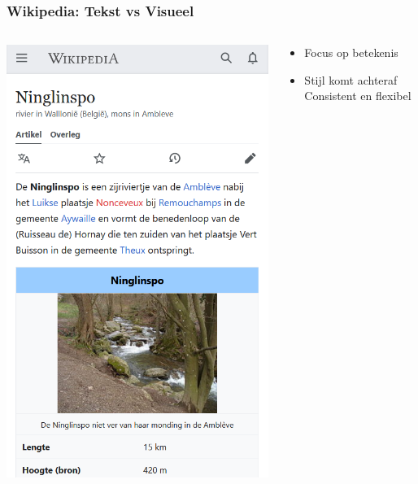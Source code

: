 \documentclass[../presentatie.tex]{subfiles}
\begin{document}
    
    \begin{frame}
        \frametitle{Wikipedia: Tekst vs Visueel}
        \begin{columns}
            \begin{column}{0.6\textwidth}
                \centering
                \includegraphics[width=\linewidth,height=0.7\textheight,keepaspectratio]{assets/wikipediaVisual}
            \end{column}
            \begin{column}{0.45\textwidth}
                \begin{itemize}
                    \item Focus op betekenis
                    \item Stijl komt achteraf \textrightarrow{} Consistent en flexibel
                \end{itemize}
            \end{column}
        \end{columns}
    \end{frame}
\end{document}
